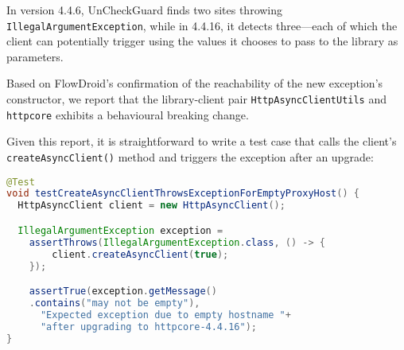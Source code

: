 In version 4.4.6, UnCheckGuard finds two sites throwing \texttt{IllegalArgumentException}, while in 4.4.16, it detects three—each of which the client can potentially trigger using the values it chooses to pass to the library as parameters.

Based on FlowDroid's confirmation of the reachability of the new exception's constructor, we report that the library-client pair \texttt{HttpAsyncClientUtils} and \texttt{httpcore} exhibits a behavioural breaking change.

Given this report, it is straightforward to write a test case that calls the client's \texttt{createAsyncClient()} method
and triggers the exception after an upgrade:
\begin{lstlisting}[language=Java]
@Test
void testCreateAsyncClientThrowsExceptionForEmptyProxyHost() {
  HttpAsyncClient client = new HttpAsyncClient();

  IllegalArgumentException exception =
    assertThrows(IllegalArgumentException.class, () -> {
        client.createAsyncClient(true);
    });

    assertTrue(exception.getMessage()
    .contains("may not be empty"),
      "Expected exception due to empty hostname "+
      "after upgrading to httpcore-4.4.16");
}
\end{lstlisting}